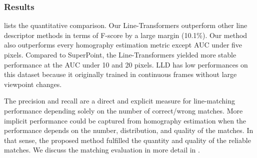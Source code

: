 \documentclass[letterpaper, 10 pt, journal, twoside]{ieeetran}
\begin{document}
\begin{table}[!t]
\centering
\caption{Homography estimation evaluation. The best-performing values are in bold font.}
\label{tab:eval_homography}
\vspace{-5mm}
\end{table}



\subsubsection{Results}

 lists the quantitative comparison. Our Line-Transformers outperform other line descriptor methods in terms of F-score by a large margin (10.1\%). Our method also outperforms every homography estimation metric except AUC under five pixels. Compared to SuperPoint, the Line-Transformers yielded more stable performance at the AUC under 10 and 20 pixels. \ac{LLD} has low performances on this dataset because it originally trained in continuous frames without large viewpoint changes.

The precision and recall are a direct and explicit measure for line-matching performance depending solely on the number of correct/wrong matches. More implicit performance could be captured from homography estimation when the performance depends on the number, distribution, and quality of the matches. In that sense, the proposed method fulfilled the quantity and quality of the reliable matches. We discuss the matching evaluation in more detail in .
\end{document}
